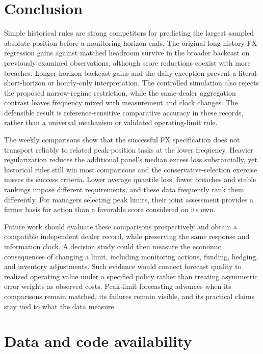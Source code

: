 \documentclass[11pt,a4paper]{article}
\begin{document}
\FloatBarrier

\section{Conclusion}\label{sec:conclusion}

Simple historical rules are strong competitors for predicting the largest sampled absolute position before a monitoring horizon ends. The original long-history FX regression gains against matched headroom survive in the broader backcast on previously examined observations, although score reductions coexist with more breaches. Longer-horizon backcast gains and the daily exception prevent a literal short-horizon or hourly-only interpretation. The controlled simulation also rejects the proposed narrow-regime restriction, while the same-dealer aggregation contrast leaves frequency mixed with measurement and clock changes. The defensible result is reference-sensitive comparative accuracy in these records, rather than a universal mechanism or validated operating-limit rule.


The weekly comparisons show that the successful FX specification does not transport reliably to related peak-position tasks at the lower frequency. Heavier regularization reduces the additional panel's median excess loss substantially, yet historical rules still win most comparisons and the conservative-selection exercise misses its success criteria. Lower average quantile loss, fewer breaches and stable rankings impose different requirements, and these data frequently rank them differently. For managers selecting peak limits, their joint assessment provides a firmer basis for action than a favorable score considered on its own.


Future work should evaluate these comparisons prospectively and obtain a compatible independent dealer record, while preserving the same response and information clock. A decision study could then measure the economic consequences of changing a limit, including monitoring actions, funding, hedging, and inventory adjustments. Such evidence would connect forecast quality to realized operating value under a specified policy rather than treating asymmetric error weights as observed costs. Peak-limit forecasting advances when its comparisons remain matched, its failures remain visible, and its practical claims stay tied to what the data measure.


\FloatBarrier

\section*{Data and code availability}
\end{document}
